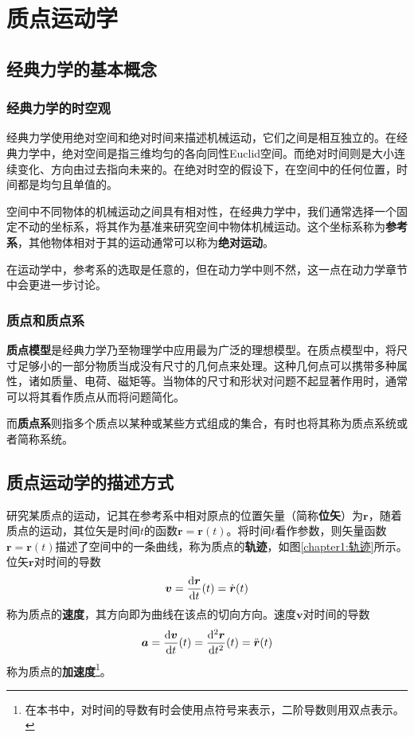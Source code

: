 \chapter{质点运动学}

\section{经典力学的基本概念}

\subsection{经典力学的时空观}

经典力学使用绝对空间和绝对时间来描述机械运动，它们之间是相互独立的。在经典力学中，绝对空间是指三维均匀的各向同性Euclid空间。而绝对时间则是大小连续变化、方向由过去指向未来的。在绝对时空的假设下，在空间中的任何位置，时间都是均匀且单值的。

空间中不同物体的机械运动之间具有相对性，在经典力学中，我们通常选择一个固定不动的坐标系，将其作为基准来研究空间中物体机械运动。这个坐标系称为{\bf 参考系}，其他物体相对于其的运动通常可以称为{\bf 绝对运动}。

在运动学中，参考系的选取是任意的，但在动力学中则不然，这一点在动力学章节中会更进一步讨论。

\subsection{质点和质点系}

{\bf 质点模型}是经典力学乃至物理学中应用最为广泛的理想模型。在质点模型中，将尺寸足够小的一部分物质当成没有尺寸的几何点来处理。这种几何点可以携带多种属性，诸如质量、电荷、磁矩等。当物体的尺寸和形状对问题不起显著作用时，通常可以将其看作质点从而将问题简化。

而{\bf 质点系}则指多个质点以某种或某些方式组成的集合，有时也将其称为质点系统或者简称系统。

\section{质点运动学的描述方式}

研究某质点的运动，记其在参考系中相对原点的位置矢量（简称{\bf 位矢}）为$\boldsymbol{r}$，随着质点的运动，其位矢是时间$t$的函数$\boldsymbol{r} = \boldsymbol{r}(t)$。将时间$t$看作参数，则矢量函数$\boldsymbol{r} = \boldsymbol{r}(t)$描述了空间中的一条曲线，称为质点的{\bf 轨迹}，如图\ref{chapter1:轨迹}所示。位矢$\boldsymbol{r}$对时间的导数
\begin{equation}
	\boldsymbol{v} = \dfrac{\mathrm{d} \boldsymbol{r}}{\mathrm{d} t}(t) = \dot{\boldsymbol{r}}(t)
	\label{chapter1:质点速度的定义}
\end{equation}
称为质点的{\bf 速度}，其方向即为曲线在该点的切向方向。速度$\boldsymbol{v}$对时间的导数
\begin{equation}
	\boldsymbol{a} = \dfrac{\mathrm{d} \boldsymbol{v}}{\mathrm{d} t}(t) = \frac{\mathrm{d}^2 \boldsymbol{r}}{\mathrm{d} t^2}(t) = \ddot{\boldsymbol{r}}(t)
	\label{chapter1:质点加速度的定义}
\end{equation}
称为质点的{\bf 加速度}\footnote{在本书中，对时间的导数有时会使用点符号来表示，二阶导数则用双点表示。}。

